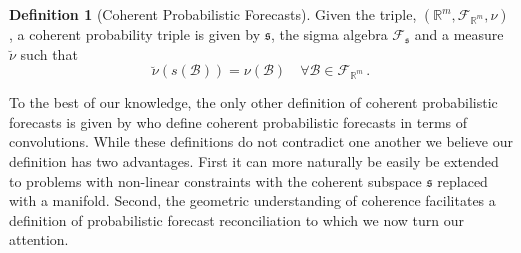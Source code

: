 \documentclass[12pt]{article}
\theoremstyle{definition}
\newtheorem{definition}{Definition}[section]
\begin{document}
\begin{definition}[Coherent Probabilistic Forecasts]\label{def:cohprob}
	Given the triple, $(\mathbb{R}^m, \mathscr{F}_{\mathbb{R}^m}, \nu)$, a coherent probability triple is given by $\mathfrak{s}$, the sigma algebra $\mathscr{F}_{\mathfrak{s}}$ and a measure $\breve{\nu}$ such that
	\[
	\breve{\nu}(s(\mathcal{B})) = \nu(\mathcal{B}) \quad \forall \mathcal{B} \in \mathscr{F}_{\mathbb{R}^m}\,.
	\]
\end{definition}

To the best of our knowledge, the only other definition of coherent probabilistic forecasts is given by \citet{BenTaieb2017} who define coherent probabilistic forecasts in terms of convolutions. While these definitions do not contradict one another we believe our definition has two advantages.  First it can more naturally be easily be extended to problems with non-linear constraints with the coherent subspace $\mathfrak{s}$ replaced with a manifold.  Second, the geometric understanding of coherence facilitates a definition of probabilistic forecast reconciliation to which we now turn our attention.

%
%	
%
\end{document}
